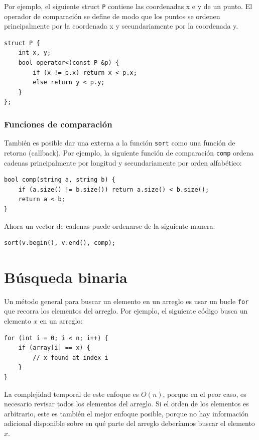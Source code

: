 Por ejemplo, el siguiente struct \texttt{P}
contiene las coordenadas x e y de un punto.
El operador de comparación se define de modo que
los puntos se ordenen principalmente por la coordenada x
y secundariamente por la coordenada y.

\begin{lstlisting}
struct P {
    int x, y;
    bool operator<(const P &p) {
        if (x != p.x) return x < p.x;
        else return y < p.y;
    }
};
\end{lstlisting}

\subsubsection{Funciones de comparación}


También es posible dar una 
externa a la función \texttt{sort}
como una función de retorno (callback).
Por ejemplo, la siguiente función de comparación \texttt{comp}
ordena cadenas principalmente por longitud y secundariamente
por orden alfabético:

\begin{lstlisting}
bool comp(string a, string b) {
    if (a.size() != b.size()) return a.size() < b.size();
    return a < b;
}
\end{lstlisting}
Ahora un vector de cadenas puede ordenarse de la siguiente manera:
\begin{lstlisting}
sort(v.begin(), v.end(), comp);
\end{lstlisting}

\section{Búsqueda binaria}


Un método general para buscar un elemento
en un arreglo es usar un bucle \texttt{for}
que recorra los elementos del arreglo.
Por ejemplo, el siguiente código busca
un elemento $x$ en un arreglo:

\begin{lstlisting}
for (int i = 0; i < n; i++) {
    if (array[i] == x) {
        // x found at index i
    }
}
\end{lstlisting}

La complejidad temporal de este enfoque es $O(n)$,
porque en el peor caso, es necesario revisar
todos los elementos del arreglo.
Si el orden de los elementos es arbitrario,
este es también el mejor enfoque posible, porque
no hay información adicional disponible sobre en qué parte
del arreglo deberíamos buscar el elemento $x$.

